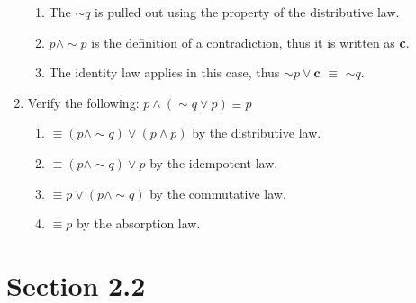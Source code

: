\documentclass{article}
\makeatletter
\newcommand\setItemnumber[1]{\setcounter{enum\romannumeral\@enumdepth}{\numexpr#1-1\relax}}
\makeatother
\begin{document}
\begin{enumerate}
\begin{enumerate}
      \item The $\sim q$ is pulled out using the property of the distributive law.
      \item $p \land \sim p$ is the definition of a contradiction, thus it is written as \textbf{c}.
      \item The identity law applies in this case, thus $\sim p \lor \textbf{c}$ $\equiv$ $\sim q$.
  \end{enumerate}
  \setItemnumber{51}
  \item Verify the following: $p \land (\sim q \lor p) \equiv p$
  \begin{enumerate}
    \item $\equiv (p \land \sim q) \lor (p \land p)$ by the distributive law.
    \item $\equiv (p \land \sim q) \lor p $ by the idempotent law.
    \item $\equiv p \lor (p \land \sim q)$ by the commutative law.
    \item $\equiv p$ by the absorption law.
  \end{enumerate}
\end{enumerate}
\section{Section 2.2}
\end{document}
